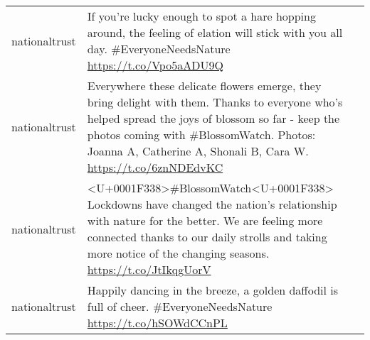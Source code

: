 \documentclass[
]{article}
\begin{document}
\begin{longtable}[]{@{}llr@{}}
\begin{minipage}[t]{0.22\columnwidth}
nationaltrust\strut
\end{minipage} & \begin{minipage}[t]{0.49\columnwidth}\raggedright
If you're lucky enough to spot a hare hopping around, the feeling of
elation will stick with you all day. \#EveryoneNeedsNature
\url{https://t.co/Vpo5aADU9Q}\strut
\end{minipage} & \begin{minipage}[t]{0.21\columnwidth}\raggedleft
698\strut
\end{minipage}\tabularnewline
\begin{minipage}[t]{0.22\columnwidth}\raggedright
nationaltrust\strut
\end{minipage} & \begin{minipage}[t]{0.49\columnwidth}\raggedright
Everywhere these delicate flowers emerge, they bring delight with them.
Thanks to everyone who's helped spread the joys of blossom so far - keep
the photos coming with \#BlossomWatch. Photos: Joanna A, Catherine A,
Shonali B, Cara W. \url{https://t.co/6znNDEdvKC}\strut
\end{minipage} & \begin{minipage}[t]{0.21\columnwidth}\raggedleft
692\strut
\end{minipage}\tabularnewline
\begin{minipage}[t]{0.22\columnwidth}\raggedright
nationaltrust\strut
\end{minipage} & \begin{minipage}[t]{0.49\columnwidth}\raggedright
\textless U+0001F338\textgreater\#BlossomWatch\textless U+0001F338\textgreater{}
Lockdowns have changed the nation's relationship with nature for the
better. We are feeling more connected thanks to our daily strolls and
taking more notice of the changing seasons.
\url{https://t.co/JtIkqgUorV}\strut
\end{minipage} & \begin{minipage}[t]{0.21\columnwidth}\raggedleft
565\strut
\end{minipage}\tabularnewline
\begin{minipage}[t]{0.22\columnwidth}\raggedright
nationaltrust\strut
\end{minipage} & \begin{minipage}[t]{0.49\columnwidth}\raggedright
Happily dancing in the breeze, a golden daffodil is full of cheer.
\#EveryoneNeedsNature \url{https://t.co/hSOWdCCnPL}\strut
\end{minipage} & \begin{minipage}[t]{0.21\columnwidth}\raggedleft

\end{minipage}
\end{longtable}
\end{document}
